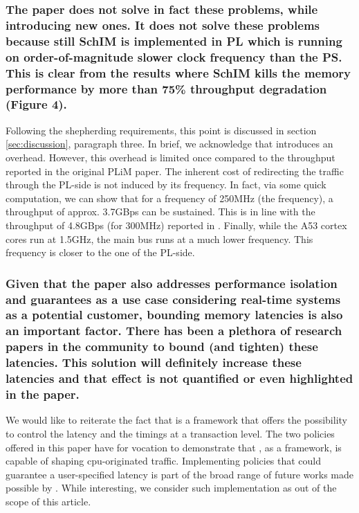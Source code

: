         \subsubsection{The paper does not solve in fact these problems, while introducing new ones. It does not solve these problems because still SchIM is implemented in PL which is running on order-of-magnitude slower clock frequency than the PS. This is clear from the results where SchIM kills the memory performance by more than 75\% throughput degradation (Figure 4).}
            Following the shepherding requirements, this point is discussed in section \ref{sec:discussion}, paragraph three.
            In brief, we acknowledge that \schim introduces an overhead. However, this overhead is limited once compared to the throughput reported in the original PLiM paper.
            The inherent cost of redirecting the traffic through the PL-side is not induced by its frequency. In fact, via some quick computation, we can show that for a frequency of 250MHz (the \schim frequency), a throughput of approx. 3.7GBps can be sustained. This is in line with the throughput of 4.8GBps (for 300MHz) reported in \cite{uiuc-xilinx-port-study}.
            Finally, while the A53 cortex cores run at 1.5GHz, the main bus runs at a much lower frequency. This frequency is closer to the one of the PL-side.

        \subsubsection{Given that the paper also addresses performance isolation and guarantees as a use case considering real-time systems as a potential customer, bounding memory latencies is also an important factor. There has been a plethora of research papers in the community to bound (and tighten) these latencies. This solution will definitely increase these latencies and that effect is not quantified or even highlighted in the paper.}
            We would like to reiterate the fact that \schim is a framework that offers the possibility to control the latency and the timings at a transaction level.
            The two policies offered in this paper have for vocation to demonstrate that \schim, as a framework, is capable of shaping cpu-originated traffic.
            Implementing policies that could guarantee a user-specified latency is part of the broad range of future works made possible by \schim.
            While interesting, we consider such implementation as out of the scope of this article.

